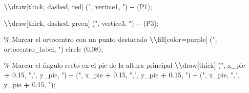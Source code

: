 \documentclass[
]{article}
\newenvironment{Shaded}{\begin{snugshade}}{\end{snugshade}}
\newcommand{\FloatTok}[1]{\textcolor[rgb]{0.00,0.00,0.81}{#1}}
\newcommand{\NormalTok}[1]{#1}
\newcommand{\SpecialCharTok}[1]{\textcolor[rgb]{0.81,0.36,0.00}{\textbf{#1}}}
\newcommand{\StringTok}[1]{\textcolor[rgb]{0.31,0.60,0.02}{#1}}
\begin{document}
\begin{Shaded}
\begin{Highlighting}[]
\StringTok{  }\SpecialCharTok{\textbackslash{}\textbackslash{}}\StringTok{draw[thick, dashed, red]}
\StringTok{    ("}\NormalTok{, vertice1, }\StringTok{") {-}{-} (P1);}

\StringTok{  }\SpecialCharTok{\textbackslash{}\textbackslash{}}\StringTok{draw[thick, dashed, green]}
\StringTok{    ("}\NormalTok{, vertice3, }\StringTok{") {-}{-} (P3);}

\StringTok{  \% Marcar el ortocentro con un punto destacado}
\StringTok{  }\SpecialCharTok{\textbackslash{}\textbackslash{}}\StringTok{fill[color=purple] ("}\NormalTok{, ortocentro\_label, }\StringTok{") circle (0.08);}

\StringTok{  \% Marcar el ángulo recto en el pie de la altura principal}
\StringTok{  }\SpecialCharTok{\textbackslash{}\textbackslash{}}\StringTok{draw[thick] ("}\NormalTok{, x\_pie }\SpecialCharTok{+} \FloatTok{0.15}\NormalTok{, }\StringTok{","}\NormalTok{, y\_pie, }\StringTok{") {-}{-} ("}\NormalTok{, x\_pie }\SpecialCharTok{+} \FloatTok{0.15}\NormalTok{, }\StringTok{","}\NormalTok{, y\_pie }\SpecialCharTok{+} \FloatTok{0.15}\NormalTok{, }\StringTok{") {-}{-} ("}\NormalTok{, x\_pie, }\StringTok{","}\NormalTok{, y\_pie }\SpecialCharTok{+} \FloatTok{0.15}\NormalTok{, }\StringTok{");}


\end{Highlighting}
\end{Shaded}
\end{document}
